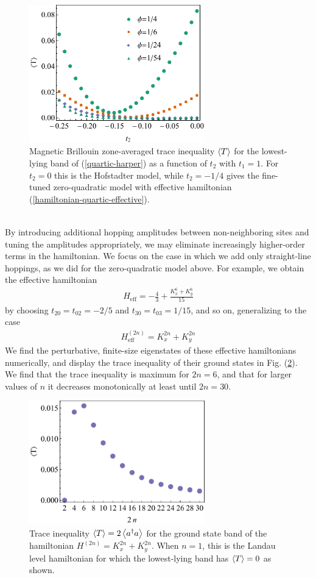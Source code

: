\documentclass[aps,prb,twocolumn,letterpaper,twoside,nobalancelastpage,groupedaddress,amsmath,amssymb,floatfix,citeautoscript]{revtex4-1}
\begin{document}
\begin{figure}[thb]
\centering
\includegraphics[width=3.0in]{trace-delta-plot-new.pdf}
\caption{\label{trace-delta-plot}Magnetic Brillouin zone-averaged trace inequality $\expval{T}$ for the lowest-lying band of (\ref{quartic-harper}) as a function of $t_2$ with $t_1 = 1$. For $t_2 = 0$ this is the Hofstadter model, while $t_2 = -1/4$ gives the fine-tuned zero-quadratic model with effective hamiltonian (\ref{hamiltonian-quartic-effective}).}
\end{figure}
\begin{align*}
\end{align*}

By introducing additional hopping amplitudes between non-neighboring sites and tuning the amplitudes appropriately, we may eliminate increasingly higher-order terms in the hamiltonian. We focus on the case in which we add only straight-line hoppings, as we did for the zero-quadratic model above. For example, we obtain the effective hamiltonian
\begin{align*}
H_{\text{eff}} = -\frac{4}{3} + \frac{K_x^6 + K_y^6}{15}
\end{align*}
by choosing $t_{20}=t_{02}=-2/5$ and $t_{30}=t_{03}=1/15$, and so on, generalizing to the case
\begin{align}
H^{(2n)}_{\text{eff}} = K_x^{2n} + K_y^{2n}
\end{align}
We find the perturbative, finite-size eigenstates of these effective hamiltonians numerically, and display the trace inequality of their ground states in Fig. (\ref{plot-2n-trace}). We find that the trace inequality is maximum for $2n=6$, and that for larger values of $n$ it decreases monotonically at least until $2n=30$.
\begin{figure}[thb]
\centering
\includegraphics[width=3.0in]{tr-v-2n.pdf}
\caption{\label{plot-2n-trace}Trace inequality $\expval{T} = 2 \expval{a^{\dag} a}$ for the ground state band of the hamiltonian $H^{(2n)}=K_x^{2n} + K_y^{2n}$. Whe{}n $n=1$, this is the Landau level hamiltonian for which the lowest-lying band has $\expval{T}=0$ as shown.}
\end{figure}
\end{document}
